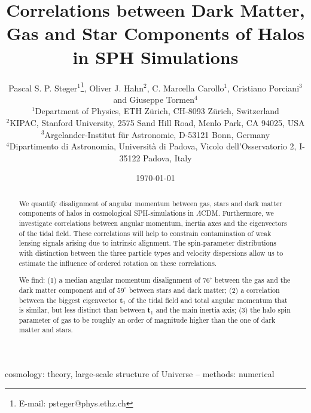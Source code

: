 \documentclass[useAMS,usenatbib]{mn2e}
\begin{document}
%
\title[Correlations between DM, Gas, Star Components]
      {Correlations between Dark Matter, Gas and Star Components of Halos in
        SPH Simulations}
\author[P. Steger et al.]{Pascal S. P. Steger$^{1}$\thanks{E-mail: psteger@phys.ethz.ch},
  Oliver J. Hahn$^{2}$,
  C. Marcella Carollo$^{1}$,
  Cristiano Porciani$^{3}$\newauthor
  and Giuseppe Tormen$^{4}$\\
  $^{1}$Department of Physics, ETH Z\"urich, CH-8093 Z\"urich,
  Switzerland\\
  $^{2}$KIPAC, Stanford University, 2575 Sand Hill Road, Menlo Park,
  CA 94025, USA\\
  $^{3}$Argelander-Institut f\"ur Astronomie, D-53121 Bonn, Germany\\
  $^{4}$Dipartimento di Astronomia, Universit\`a di Padova,
  Vicolo dell'Osservatorio 2, I-35122 Padova, Italy }
%
%
\date{\today}
\pagerange{\pageref{firstpage}--\pageref{lastpage}} 
\maketitle
\label{firstpage}
\begin{abstract}
  We quantify disalignment of angular momentum between gas, stars and dark
  matter components of halos in cosmological SPH-simulations in
  $\Lambda$CDM. Furthermore, we investigate correlations between angular
  momentum, inertia axes and the eigenvectors of the tidal field. These
  correlations will help to constrain contamination of weak lensing signals
  arising due to intrinsic alignment. The spin-parameter distributions with
  distinction between the three particle types and velocity dispersions allow
  us to estimate the influence of ordered rotation on these correlations.

  We find:
%
  (1) a median angular momentum disalignment of $76^\circ$ between the gas and
  the dark matter component and of $59^\circ$ between stars and dark matter;
%
  (2) a correlation between the biggest eigenvector $\mathbf{t}_1$ of the
  tidal field and total angular momentum that is similar, but less distinct
  than between $\mathbf{t}_1$ and the main inertia axis;
%
  (3) the halo spin parameter of gas to be roughly an order of magnitude
  higher than the one of dark matter and stars.
\end{abstract}
%
\begin{keywords}
  cosmology: theory, large-scale structure of Universe --
  methods: numerical
\end{keywords}
%
%
\end{document}
